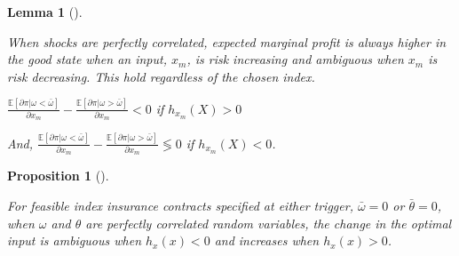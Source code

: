 \documentclass[
  letterpaper,
  DIV=11,
  numbers=noendperiod]{scrartcl}
\theoremstyle{plain}
\newtheorem{lemma}{Lemma}[section]
\theoremstyle{plain}
\newtheorem{proposition}{Proposition}[section]
\theoremstyle{remark}
\begin{document}
\begin{lemma}[]\protect\hypertarget{lem-cor}{}\label{lem-cor}

When shocks are perfectly correlated, expected marginal profit is always
higher in the good state when an input, \(x_m\), is risk increasing and
ambiguous when \(x_m\) is risk decreasing. This hold regardless of the
chosen index.

\(\frac{\mathbb{E}[\partial \pi|\omega<\bar \omega]}{\partial x_m}-\frac{\mathbb{E}[\partial \pi|\omega>\bar \omega]}{\partial x_m}<0\)
if \(h_{x_m}(X)>0\)

And,
\(\frac{\mathbb{E}[\partial \pi|\omega<\bar \omega]}{\partial x_m}-\frac{\mathbb{E}[\partial \pi|\omega>\bar \omega]}{\partial x_m}\lessgtr 0\)
if \(h_{x_m}(X)<0\).

\end{lemma}

\begin{proposition}[]\protect\hypertarget{prp-corr}{}\label{prp-corr}

For feasible index insurance contracts specified at either trigger,
\(\bar\omega=0\) or \(\bar\theta=0\), when \(\omega\) and \(\theta\) are
perfectly correlated random variables, the change in the optimal input
is ambiguous when \(h_x(x)<0\) and increases when \(h_x(x)>0\).

\end{proposition}
\end{document}
